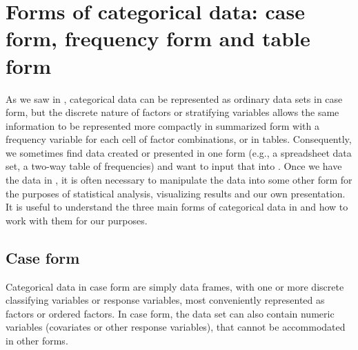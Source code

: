 \documentclass[10pt,krantz2]{krantz}\usepackage[]{graphicx}\usepackage[]{color}
\makeatletter
\newcommand{\hlstr}[1]{\textcolor[rgb]{0.192,0.494,0.8}{#1}}%
\newcommand{\hlopt}[1]{\textcolor[rgb]{0,0,0}{#1}}%
\newcommand{\hlstd}[1]{\textcolor[rgb]{0.345,0.345,0.345}{#1}}%
\newcommand{\hlkwb}[1]{\textcolor[rgb]{0.69,0.353,0.396}{#1}}%
\newcommand{\hlkwc}[1]{\textcolor[rgb]{0.333,0.667,0.333}{#1}}%
\newcommand{\hlkwd}[1]{\textcolor[rgb]{0.737,0.353,0.396}{\textbf{#1}}}%
\newenvironment{kframe}{%
 \def\at@end@of@kframe{}%
 \ifinner\ifhmode%
  \def\at@end@of@kframe{\end{minipage}}%
  \begin{minipage}{\columnwidth}%
 \fi\fi%
 \def\FrameCommand##1{\hskip\@totalleftmargin \hskip-\fboxsep
 \colorbox{shadecolor}{##1}\hskip-\fboxsep
     \hskip-\linewidth \hskip-\@totalleftmargin \hskip\columnwidth}%
 \MakeFramed {\advance\hsize-\width
   \@totalleftmargin\z@ \linewidth\hsize
   \@setminipage}}%
 {\par\unskip\endMakeFramed%
 \at@end@of@kframe}
\newenvironment{knitrout}{}{} %
\renewenvironment{knitrout}{\small\renewcommand{\baselinestretch}{.85}}{} %
\makeatother
\begin{document}

\section{Forms of categorical data: case form, frequency form and table form}\label{sec:forms}
As we saw in , categorical data can be represented as ordinary data sets
in case form, but the discrete nature of factors or stratifying variables allows the same
information to be represented more compactly in summarized form with a frequency
variable for each cell of factor combinations, or in tables.
Consequently, we sometimes
find data created or presented in one form (e.g., a spreadsheet data set, a two-way
table of frequencies) and want to input that into \R.  Once we have the data in \R,
it is often necessary to manipulate the data into some other form for the purposes
of statistical analysis, visualizing results and our own presentation.
It is useful to understand the three main forms of categorical data in \R and how
to work with them for our purposes.

\subsection{Case form}
Categorical data in case form are simply data frames, with one or more discrete
classifying variables or response variables, most conveniently represented as factors or ordered factors.  In case form, the data set can also contain numeric variables
(covariates or other response variables), that cannot be accommodated in other
forms.
\end{document}
